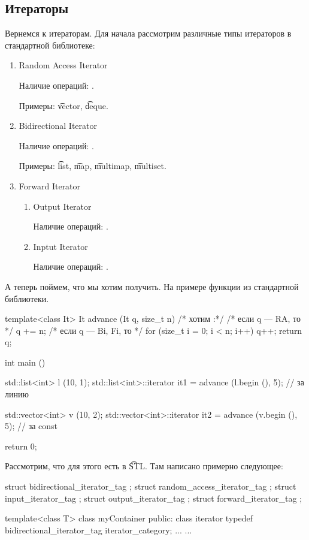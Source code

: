 \subsection{Итераторы}
Вернемся к итераторам.
Для начала рассмотрим различные типы итераторов в стандартной библиотеке:
\begin{enumerate}
\item 
	Random Access Iterator 

	Наличие операций: \cpp{*->, ++, --, -, +=, -=}.

	Примеры: \t{vector}, \t{deque}.
\item
	Bidirectional Iterator

	Наличие операций: \cpp{*->, ++, --}.

	Примеры: \t{list}, \t{map}, \t{multimap}, \t{multiset}.
\item
	Forward Iterator 
	\begin{enumerate}
	\item
		Output Iterator

		Наличие операций: .
	\item
		Inptut Iterator

		Наличие операций: .
	\end{enumerate}
\end{enumerate}

А теперь поймем, что мы хотим получить.
На примере функции  из стандартной библиотеки.
\begin{cppcode}
template<class It>
It advance (It q, size_t n) {
	/* хотим :*/
	/* если q --- RA, то */
		q += n;
	/* если q --- Bi, Fi, то */
		for (size_t i = 0; i < n; i++)
			q++;
	return q;
}

int main () {
	std::list<int> l (10, 1); 
	std::list<int>::iterator 	it1 = advance (l.begin (), 5); // за линию 

	std::vector<int> v (10, 2);
	std::vector<int>::iterator 	it2 = advance (v.begin (), 5); // за const

	return 0;
}
\end{cppcode}

Рассмотрим, что для этого есть в \t{STL}. 
Там написано примерно следующее:
\begin{cppcode}
struct bidirectional_iterator_tag {};
struct random_access_iterator_tag {};
struct input_iterator_tag {};
struct output_iterator_tag {};
struct forward_iterator_tag {};

template<class T> 
class myContainer {
public:
	class iterator {
		typedef bidirectional_iterator_tag iterator_category;
		...
	}
	...
}
\end{cppcode}

